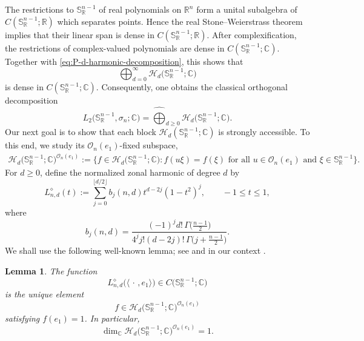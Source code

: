 \documentclass[11pt,showkeys]{amsart}
\newtheorem{lemma}[theorem]{Lemma}
\begin{document}
The restrictions to $\mathbb S_{\mathbb R}^{n-1}$ of real polynomials on
$\mathbb R^n$ form a unital subalgebra of
$C(\mathbb S_{\mathbb R}^{n-1};\mathbb R)$ which separates points. Hence the
real Stone--Weierstrass theorem implies that their linear span is dense in
$C(\mathbb S_{\mathbb R}^{n-1};\mathbb R)$. After complexification, the
restrictions of complex-valued polynomials are dense in
$C(\mathbb S_{\mathbb R}^{n-1};\mathbb C)$. Together with
\eqref{eq:P-d-harmonic-decomposition}, this shows that
\[
\bigoplus_{d=0}^{\infty}
\mathcal H_d\bigl(\mathbb S_{\mathbb R}^{n-1};\mathbb C\bigr)
\]
is dense in $C(\mathbb S_{\mathbb R}^{n-1};\mathbb C)$. Consequently, one
obtains the classical orthogonal decomposition
\begin{equation}
\label{eq:L2-harmonic-decomposition}
L_2\bigl(\mathbb S_{\mathbb R}^{n-1},\sigma_n;\mathbb C\bigr)
=
\widehat{\bigoplus}_{d\geq 0}
\mathcal H_d\bigl(\mathbb S_{\mathbb R}^{n-1};\mathbb C\bigr).
\end{equation}
Our next goal is to show that each block
$\mathcal H_d(\mathbb S_{\mathbb R}^{n-1};\mathbb C)$ is strongly
accessible. To this end, we study its $\mathcal O_n(e_1)$-fixed subspace,
\[
\begin{split}
\mathcal H_d\bigl(\mathbb S_{\mathbb R}^{n-1};\mathbb C\bigr)^{\mathcal O_n(e_1)}
:=
\bigl\{
f\in\mathcal H_d\bigl(\mathbb S_{\mathbb R}^{n-1};\mathbb C\bigr):
f(u\xi)=f(\xi) 
\text{ for all }u\in\mathcal O_n(e_1)
\text{ and }\xi\in\mathbb S_{\mathbb R}^{n-1}
\bigr\}.
\end{split}
\]
For $d\geq 0$, define the normalized zonal harmonic of degree $d$ by
\[
L^\diamond_{n,d}(t)
:=
\sum_{j=0}^{\lfloor d/2\rfloor}
b_j(n,d)t^{d-2j}(1-t^2)^j,
\qquad
-1\leq t\leq 1,
\]
where
\[
b_j(n,d)
=
\frac{(-1)^j d!\,\Gamma\bigl(\frac{n-1}{2}\bigr)}
{4^j j!(d-2j)!\,
\Gamma\bigl(j+\frac{n-1}{2}\bigr)}.
\]
We shall use the following well-known lemma; see
\cite[Section~2.1.2]{atkinson2012spherical} and in our context
\cite[Proposition~3.4 and Corollary~3.5]{defant2026minimal}.


\begin{lemma}
\label{lem:diamond-function}
The function
\[
L^\diamond_{n,d}\bigl(\langle\,\cdot\,,e_1\rangle\bigr)
\in
C\bigl(\mathbb S_{\mathbb R}^{n-1};\mathbb C\bigr)
\]
is the unique element
\[
f\in
\mathcal H_d\bigl(\mathbb S_{\mathbb R}^{n-1};\mathbb C\bigr)^{\mathcal O_n(e_1)}
\]
satisfying $f(e_1)=1$. In particular,
\[
\dim_{\mathbb C}
\mathcal H_d\bigl(\mathbb S_{\mathbb R}^{n-1};\mathbb C\bigr)^{\mathcal O_n(e_1)}
=1.
\]
\end{lemma}
\end{document}
